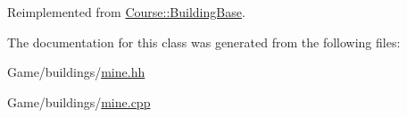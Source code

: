 Reimplemented from \hyperlink{classCourse_1_1BuildingBase_ac2cc44e08dc73d05b1617bf71295baaf}{Course\-::\-Building\-Base}.



The documentation for this class was generated from the following files\-:\begin{DoxyCompactItemize}
\item 
Game/buildings/\hyperlink{mine_8hh}{mine.\-hh}\item 
Game/buildings/\hyperlink{mine_8cpp}{mine.\-cpp}\end{DoxyCompactItemize}
